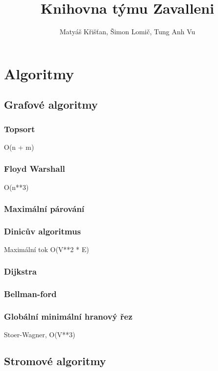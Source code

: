 \documentclass[10pt, a4paper]{article}
\title{Knihovna týmu Zavalleni}
\author{Matyáš Křišťan, Šimon Lomič, Tung Anh Vu}
\begin{document}
\tableofcontents

\section{Algoritmy}
\subsection{Grafové algoritmy}

\subsubsection{Topsort}
O(n + m)


\subsubsection{Floyd Warshall}
O(n**3)


\subsubsection{Maximální párování}


\subsubsection{Dinicův algoritmus}
Maximální tok O(V**2 * E)


\subsubsection{Dijkstra}


\subsubsection{Bellman-ford}


\subsubsection{Globální minimální hranový řez}
Stoer-Wagner, O(V**3)


\subsection{Stromové algoritmy}
\end{document}
